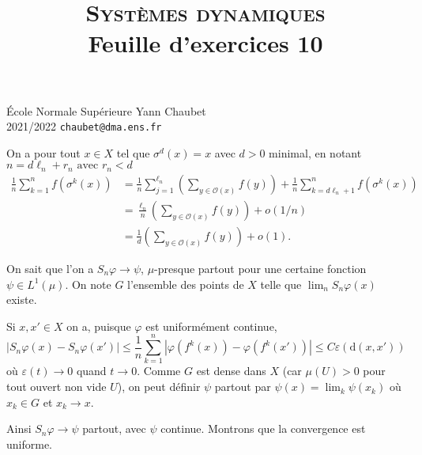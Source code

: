 \documentclass[a4paper,12pt,openany]{article}
\title{\textsc{Syst\`emes dynamiques} \\  Feuille d'exercices 10}
\date{}
\author{}
\theoremstyle{plain}
\theoremstyle{definition}
\newcommand{\dd}{\mathrm{d}}
\begin{document}
{\noindent \'Ecole Normale Sup\'erieure  \hfill Yann Chaubet } \\
{2021/2022 \hfill  \texttt{chaubet@dma.ens.fr}}

{\let\newpage\relax\maketitle}
\maketitle
 
 
\vspace{1cm}
 \vspace{1.5mm} 

On a pour tout $x \in X$ tel que $\sigma^d(x) = x$ avec $d > 0$ minimal, en notant $n = d \ell_n + r_n \text{ avec }r_n < d$
$$
\begin{aligned}
\frac{1}{n}\sum_{k=1}^n f(\sigma^k(x)) &= \frac{1}{n} \sum_{j=1}^{\ell_n} \left(\sum_{y \in \mathcal{O}(x)} f(y)\right) + \frac{1}{n} \sum_{k=d\ell_n + 1}^{n} f(\sigma^k(x)) \\
&= \frac{\ell_n}{n} \left(\sum_{y \in \mathcal{O}(x)} f(y)\right) + o(1/n)\\
&= \frac{1}{d} \left(\sum_{y \in \mathcal{O}(x)} f(y)\right) + o(1).
\end{aligned}
$$
\vspace{0.6cm}

 \vspace{1.5mm} 

\noindent
On sait que l'on a $S_n \varphi \to \psi$, $\mu$-presque partout pour une certaine fonction $\psi \in L^1(\mu)$. On note $G$ l'ensemble des points de $X$ telle que $\lim_n S_n \varphi(x)$ existe. 
 
\noindent
Si $x,x' \in X$ on a, puisque $\varphi$ est uniform\'ement continue,
$$
|S_n \varphi(x) - S_n\varphi(x')| \leqslant \frac{1}{n} \sum_{k=1}^n |\varphi(f^k(x))-\varphi(f^k(x'))| \leqslant C \varepsilon\left(\dd(x,x')\right) $$
o\`u $\varepsilon(t) \to 0$ quand $t \to 0$.  Comme $G$ est dense dans $X$ (car $\mu(U) > 0$ pour tout ouvert non vide $U$), on peut d\'efinir $\psi$ partout par $\psi(x) = \lim_{k} \psi(x_k)$ o\`u $x_k \in G$ et $x_k \to x.$  

\noindent
Ainsi $S_n \varphi \to \psi$ partout, avec $\psi$ continue.  
\noindent
Montrons que la convergence est uniforme. 
\end{document}
